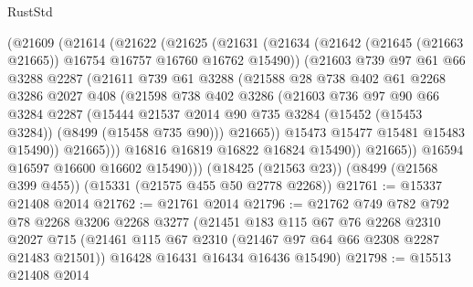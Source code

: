 \begin{lexlean}{RustStd}
\begin{coremodule}
            (@21609
              (@21614
                (@21622
                  (@21625
                    (@21631
                      (@21634 (@21642 (@21645 (@21663 @21665)) @16754 @16757 @16760 @16762 @15490))
                      (@21603
                        @739
                        @97
                        @61
                        @66
                        @3288
                        @2287
                        (@21611
                          @739
                          @61
                          @3288
                          (@21588
                            @28
                            @738
                            @402
                            @61
                            @2268
                            @3286
                            @2027
                            @408
                            (@21598
                              @738
                              @402
                              @3286
                              (@21603
                                @736
                                @97
                                @90
                                @66
                                @3284
                                @2287
                                (@15444
                                  @21537
                                  @2014
                                  @90
                                  @735
                                  @3284
                                  (@15452 (@15453 @3284))
                                  (@8499 (@15458 @735 @90)))
                                @21665))
                            @15473
                            @15477
                            @15481
                            @15483
                            @15490))
                        @21665)))
                  @16816
                  @16819
                  @16822
                  @16824
                  @15490))
              @21665))
          @16594
          @16597
          @16600
          @16602
          @15490)))
    (@18425 (@21563 @23))
    (@8499 (@21568 @399 @455))
    (@15331 (@21575 @455 @50 @2778 @2268))
@21761 := @15337 @21408 @2014
@21762 := @21761 @2014
@21796 := @21762
    @749
    @782
    @792
    @78
    @2268
    @3206
    @2268
    @3277
    (@21451
      @183
      @115
      @67
      @76
      @2268
      @2310
      @2027
      @715
      (@21461 @115 @67 @2310 (@21467 @97 @64 @66 @2308 @2287 @21483 @21501))
      @16428
      @16431
      @16434
      @16436
      @15490)
@21798 := @15513 @21408 @2014

\end{coremodule}
\end{lexlean}
